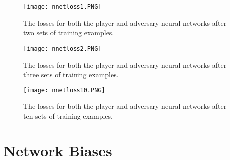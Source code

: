 \documentclass[../main.tex]{subfiles}
\begin{document}
{\begin{figure}[h]
    \centering
    \texttt{[image: nnetloss1.PNG]}
    \caption{The losses for both the player and adversary neural networks after two sets of training examples.}
    \label{fig:nnetlosses1}
\end{figure}

\begin{figure}[h]
    \centering
    \texttt{[image: nnetloss2.PNG]}
    \caption{The losses for both the player and adversary neural networks after three sets of training examples.}
    \label{fig:nnetlosses2}
\end{figure}

\begin{figure}[h]
    \centering
    \texttt{[image: nnetloss10.PNG]}
    \caption{The losses for both the player and adversary neural networks after ten sets of training examples.}
    \label{fig:nnetlosses10}
\end{figure}

\section{Network Biases}

} %
\onlyinsubfile{}
\end{document}
